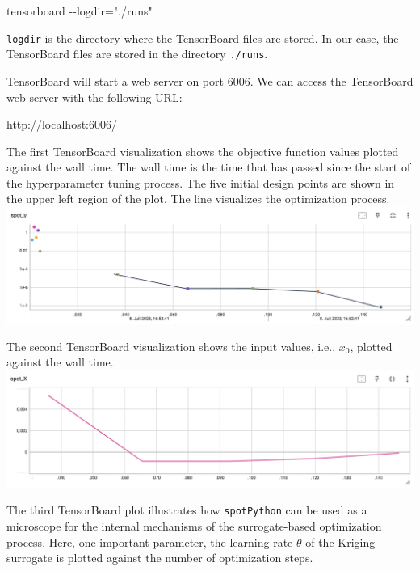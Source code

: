 \documentclass[
  letterpaper,
  DIV=11,
  numbers=noendperiod]{scrreprt}
\newenvironment{Shaded}{\begin{snugshade}}{\end{snugshade}}
\newcommand{\NormalTok}[1]{\textcolor[rgb]{0.00,0.23,0.31}{#1}}
\begin{document}
\begin{Shaded}
\begin{Highlighting}[]
\NormalTok{tensorboard {-}{-}logdir="./runs"}
\end{Highlighting}
\end{Shaded}

\texttt{logdir} is the directory where the TensorBoard files are stored.
In our case, the TensorBoard files are stored in the directory
\texttt{./runs}.

TensorBoard will start a web server on port 6006. We can access the
TensorBoard web server with the following URL:

\begin{Shaded}
\begin{Highlighting}[]
\NormalTok{http://localhost:6006/}
\end{Highlighting}
\end{Shaded}

The first TensorBoard visualization shows the objective function values
plotted against the wall time. The wall time is the time that has passed
since the start of the hyperparameter tuning process. The five initial
design points are shown in the upper left region of the plot. The line
visualizes the optimization process.
\includegraphics{figures_static/01_tensorboard_01.png}

The second TensorBoard visualization shows the input values, i.e.,
\(x_0\), plotted against the wall time.
\includegraphics{figures_static/01_tensorboard_02.png}

The third TensorBoard plot illustrates how \texttt{spotPython} can be
used as a microscope for the internal mechanisms of the surrogate-based
optimization process. Here, one important parameter, the learning rate
\(\theta\) of the Kriging surrogate is plotted against the number of
optimization steps.
\end{document}
